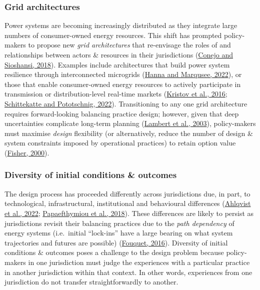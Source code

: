 \documentclass[12pt,a4paper,]{report}
\begin{document}
\hypertarget{grid-architectures}{%
\subsubsection{Grid architectures}\label{grid-architectures}}

Power systems are becoming increasingly distributed as they integrate
large numbers of consumer-owned energy resources. This shift has
prompted policy-makers to propose new \emph{grid architectures} that
re-envisage the roles of and relationships between actors \& resources
in their jurisdictions
(\protect\hyperlink{ref-conejoRethinkingRestructuredElectricity2018}{Conejo
and Sioshansi, 2018}). Examples include architectures that build power
system resilience through interconnected microgrids
(\protect\hyperlink{ref-hannaDesigningResilientDecentralized2022}{Hanna
and Marqusee, 2022}), or those that enable consumer-owned energy
resources to actively participate in transmission or distribution-level
real-time markets
(\protect\hyperlink{ref-kristovTaleTwoVisions2016}{Kristov et al.,
2016};
\protect\hyperlink{ref-schittekatteDistributedEnergyResources2022}{Schittekatte
and Pototschnig, 2022}). Transitioning to any one grid architecture
requires forward-looking balancing practice design; however, given that
deep uncertainties complicate long-term planning
(\protect\hyperlink{ref-lambertChallengeLongTermPolicy2003}{Lambert et
al., 2003}), policy-makers must maximise \emph{design} flexibility (or
alternatively, reduce the number of design \& system constraints imposed
by operational practices) to retain option value
(\protect\hyperlink{ref-fisherInvestmentUncertaintyOption2000}{Fisher,
2000}).

\hypertarget{diversity-of-initial-conditions-outcomes}{%
\subsubsection{Diversity of initial conditions \&
outcomes}\label{diversity-of-initial-conditions-outcomes}}

The design process has proceeded differently across jurisdictions due,
in part, to technological, infrastructural, institutional and
behavioural differences
(\protect\hyperlink{ref-ahlqvistSurveyComparingCentralized2022}{Ahlqvist
et al., 2022};
\protect\hyperlink{ref-papaefthymiouPowerSystemFlexibility2018}{Papaefthymiou
et al., 2018}). These differences are likely to persist as jurisdictions
revisit their balancing practices due to the \emph{path dependency} of
energy systems (i.e.~initial ``lock-ins'' have a large bearing on what
system trajectories and futures are possible)
(\protect\hyperlink{ref-fouquetPathDependenceEnergy2016}{Fouquet,
2016}). Diversity of initial conditions \& outcomes poses a challenge to
the design problem because policy-makers in one jurisdiction must judge
the experiences with a particular practice in another jurisdiction
within that context. In other words, experiences from one jurisdiction
do not transfer straightforwardly to another.
\end{document}
